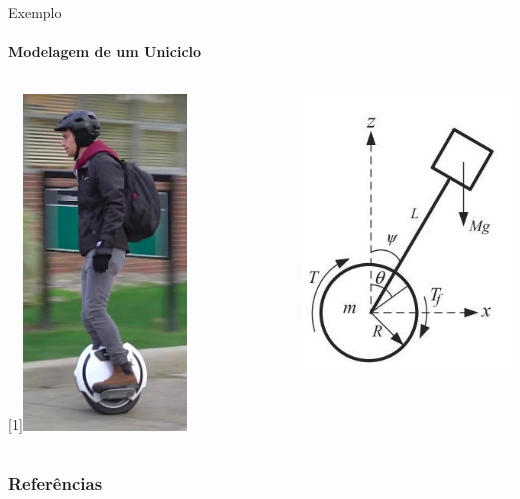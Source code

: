 \documentclass{beamer}
\begin{document}
\begin{frame}[c]{Exemplo}
    \framesubtitle{Modelagem de um Uniciclo}
    \begin{columns}
        \begin{column}[c]{0.4\textwidth}
            \centering
            \scalebox{-1}[1]{\includegraphics[width=0.6\textwidth]{./images/unicycle_2.jpg}}
        \end{column}
        \begin{column}[c]{0.6\textwidth}
            \centering
            \includegraphics[width=.6\textwidth]{./images/unicycle_model.jpg}
        \end{column}
    \end{columns}
\end{frame}






\begin{frame}[t, allowframebreaks]
	\frametitle{Referências}
	
\end{frame}
  
\end{document}
